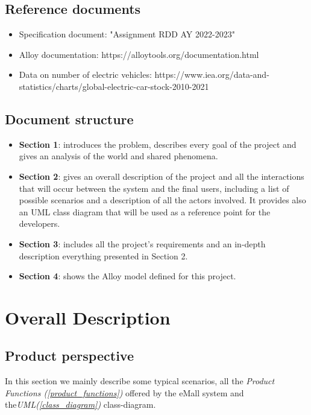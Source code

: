 \documentclass[table, 12pt]{article} %
\begin{document}
    \subsection{Reference documents}
        \begin{itemize}
            \item Specification document: "Assignment RDD AY 2022-2023"
            \item Alloy documentation: https://alloytools.org/documentation.html
            \item Data on number of electric vehicles: https://www.iea.org/data-and-statistics/charts/global-electric-car-stock-2010-2021
        \end{itemize}
    
    \subsection{Document structure}
        \begin{itemize}
            \item \textbf{Section 1}: introduces the problem, describes every goal of the project and gives an analysis of the world and shared phenomena.
            \item \textbf{Section 2}: gives an overall description of the project and all the interactions that will occur between the system and the final users, including a list of possible scenarios and a description of all the actors involved. It provides also an UML class diagram that will be used as a reference point for the developers.
            \item \textbf{Section 3}: includes all the project's requirements and an in-depth description everything presented in Section 2.
            \item \textbf{Section 4}: shows the Alloy model defined for this project.
        \end{itemize}

    \newpage



    

    \section{Overall Description}

    \subsection{Product perspective}
    In this section we mainly describe some typical scenarios, all the \textit{Product Functions (\ref{product_functions})} offered by the eMall system and the\textit{UML(\ref{class_diagram})} class-diagram.
\end{document}
